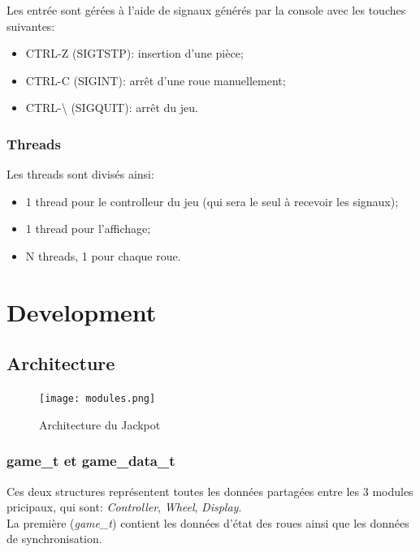 \documentclass[11pt, a4paper]{article}
\begin{document}
Les entrée sont gérées à l'aide de signaux générés par la console avec les touches suivantes:
\begin{itemize}
    \item CTRL-Z (SIGTSTP): insertion d'une pièce;
    \item CTRL-C (SIGINT): arrêt d'une roue manuellement;
    \item CTRL-\textbackslash{} (SIGQUIT): arrêt du jeu.
\end{itemize}

\subsubsection{Threads}

Les threads sont divisés ainsi:
\begin{itemize}
    \item 1 thread pour le controlleur du jeu (qui sera le seul à recevoir les signaux);
    \item 1 thread pour l'affichage;
    \item N threads, 1 pour chaque roue.
\end{itemize}

\newpage

\section{Development}
\subsection{Architecture}

\begin{figure}[H]
    \begin{center}
        \texttt{[image: modules.png]}
    \end{center}
    \caption{Architecture du Jackpot}
    \label{Architecture du Jackpot}
\end{figure}

\subsubsection{game\_t et game\_data\_t}
Ces deux structures représentent toutes les données partagées entre les 3 modules pricipaux,
qui sont: \textit{Controller}, \textit{Wheel}, \textit{Display}. \\

La première (\textit{game\_t}) contient les données d'état des roues ainsi que les données de synchronisation. \\
\end{document}
